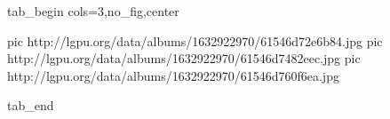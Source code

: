  
 
 
 
 


\ifcmt
  tab_begin cols=3,no_fig,center

     pic http://lgpu.org/data/albums/1632922970/61546d72e6b84.jpg
		 pic http://lgpu.org/data/albums/1632922970/61546d7482eec.jpg
		 pic http://lgpu.org/data/albums/1632922970/61546d760f6ea.jpg

  tab_end
\fi
